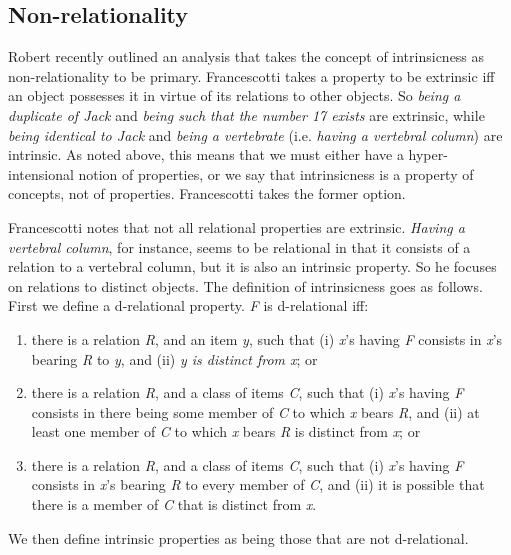 \subsection{Non-relationality}
Robert \citet{Francescotti1999} recently outlined an analysis that takes the concept of intrinsicness as non-relationality to be primary. Francescotti takes a property to be extrinsic iff an object possesses it in virtue of its relations to other objects. So \textit{being a duplicate of Jack} and \textit{being such that the number 17 exists} are extrinsic, while \textit{being identical to Jack} and \textit{being a vertebrate} (i.e. \textit{having a vertebral column}) are intrinsic. As noted above, this means that we must either have a hyper-intensional notion of properties, or we say that intrinsicness is a property of concepts, not of properties. Francescotti takes the former option.

Francescotti notes that not all relational properties are extrinsic. \textit{Having a vertebral column}, for instance, seems to be relational in that it consists of a relation to a vertebral column, but it is also an intrinsic property. So he focuses on relations to distinct objects. The definition of intrinsicness goes as follows. First we define a d-relational property. \textit{F} is d-relational iff:

\begin{enumerate}
\renewcommand{\labelenumi}{(\alph{enumi})}
\item there is a relation \textit{R}, and an item \textit{y}, such that (i) \textit{x}'s having \textit{F} consists in \textit{x}'s bearing \textit{R} to \textit{y}, and (ii) \textit{y is distinct from x}; or 

\item there is a relation \textit{R}, and a class of items \textit{C}, such that (i) \textit{x}'s having \textit{F} consists in there being some member of \textit{C} to which \textit{x} bears \textit{R}, and (ii) at least one member of \textit{C} to which \textit{x} bears \textit{R} is distinct from \textit{x}; or

\item there is a relation \textit{R}, and a class of items \textit{C}, such that (i) \textit{x}'s having \textit{F} consists in \textit{x}'s bearing \textit{R} to every member of \textit{C}, and (ii) it is possible that there is a member of \textit{C} that is distinct from \textit{x}.
\end{enumerate}

\noindent We then define intrinsic properties as being those that are not d-relational.

